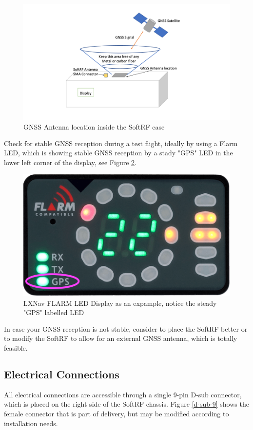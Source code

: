 \documentclass[10pt,a4paper]{article}
\begin{document}
\begin{figure}[h]
\centering
\includegraphics[scale=.5]{gnss_antenna.png}
\caption{GNSS Antenna location inside the SoftRF case}\label{fig_gnss_ant}
\end{figure}

Check for stable  GNSS reception during a test flight, ideally by using a Flarm LED, which is showing stable GNSS reception by a stady "GPS" LED in the lower left corner of the display, see Figure \ref{flarm_led}.

\begin{figure}[h]
\centering
\includegraphics[scale=.4]{lxnav_flarm_led_display.png}
\caption{LXNav FLARM LED Display as an expample, notice the steady "GPS" labelled LED}\label{flarm_led}
\end{figure}

In case your GNSS reception is not stable, consider to place the SoftRF better or to modify the SoftRF to allow for an external GNSS antenna, which is totally feasible.

\FloatBarrier

\subsection{Electrical Connections}
All electrical connections are accessible through a single 9-pin D-sub connector, which is placed on the right side of the SoftRF chassis. Figure \ref{d-sub-9} shows the female connector that is part of delivery, but may be modified according to installation needs.
\end{document}
